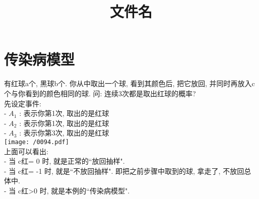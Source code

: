 \documentclass[UTF8]{ctexart}
\title{文件名}
\begin{document}
	\tableofcontents %
	\date{} %
	\maketitle  %
	
	
	
	
	
	\section{传染病模型}
	
	
	\begin{myEnvSample}
		有红球a个, 黑球b个. 你从中取出一个球, 看到其颜色后, 把它放回, 并同时再放入c个与你看到的颜色相同的球. 	问:  连续3次都是取出红球的概率? \\
		先设定事件: \\
		- $A_1$ : 表示你第1次, 取出的是红球 \\
		- $A_2$ : 表示你第1次, 取出的是红球 \\	
		- $A_3$ : 表示你第3次, 取出的是红球 \\	
		
		\texttt{[image: /0094.pdf]} \\
		
		上面可以看出: \\
		- 当 c红= 0 时, 就是正常的``放回抽样". \\
		- 当 c红= -1 时, 就是``不放回抽样". 即把之前步骤中取到的球, 拿走了, 不放回总体中. \\
		- 当 c红>0 时, 就是本例的``传染病模型".	
	\end{myEnvSample}
	
	
	
	
	
\end{document}
